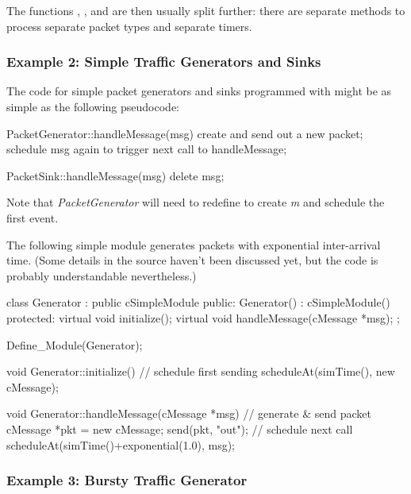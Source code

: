 The functions , ,
and  are then usually split further: there are separate
methods to process separate packet types and separate timers.


\subsubsection{Example 2: Simple Traffic Generators and Sinks}
\label{sec:simple-modules:handlemessage:traffic-generator-example}


The code for simple packet generators and sinks programmed with
 might be as simple as the following pseudocode:

\begin{cpp}
PacketGenerator::handleMessage(msg)
{
    create and send out a new packet;
    schedule msg again to trigger next call to handleMessage;
}

PacketSink::handleMessage(msg)
{
    delete msg;
}
\end{cpp}

Note that \textit{PacketGenerator} will need to redefine 
to create \textit{m} and schedule the first event.

The following simple module generates packets with exponential
inter-arrival time. (Some details in the source haven't been
discussed yet, but the code is probably understandable nevertheless.)


\begin{cpp}
class Generator : public cSimpleModule
{
  public:
    Generator() : cSimpleModule() {}
  protected:
    virtual void initialize();
    virtual void handleMessage(cMessage *msg);
};

Define_Module(Generator);

void Generator::initialize()
{
    // schedule first sending
    scheduleAt(simTime(), new cMessage);
}

void Generator::handleMessage(cMessage *msg)
{
    // generate & send packet
    cMessage *pkt = new cMessage;
    send(pkt, "out");
    // schedule next call
    scheduleAt(simTime()+exponential(1.0), msg);
}
\end{cpp}



\subsubsection{Example 3: Bursty Traffic Generator}
\label{sec:simple-modules:handlemessage:bursty-trafgen-example}

